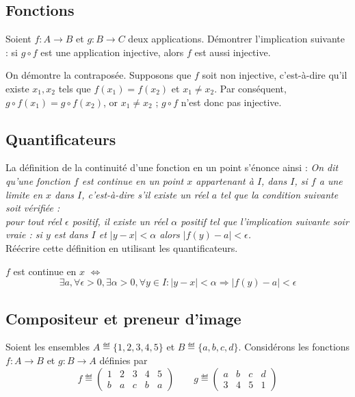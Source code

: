 \subsection{Fonctions}
Soient $f : A \rightarrow B$ et $g : B \rightarrow C$ deux applications. Démontrer l'implication suivante : si $ g \circ f$ est une application injective, alors $f$ est aussi injective. 

\begin{solution}
    On démontre la contraposée. Supposons que $f$ soit non injective, c'est-à-dire qu'il existe $x_1, x_2$ tels que $f(x_1) = f(x_2)$ et $x_1 \neq x_2$. Par conséquent, $g \circ f (x_1) = g \circ f(x_2)$, or $x_1 \neq x_2$ ; $g \circ f$ n'est donc pas injective.
\end{solution}

\subsection{Quantificateurs}
La définition de la continuité d'une fonction en un point s'énonce ainsi : \emph{On dit qu'une fonction $f$ est continue en un point $x$ appartenant à $I$, dans $I$, si $f$ a une limite en $x$ dans $I$, c'est-à-dire s'il existe un réel $a$ tel que la condition suivante soit vérifiée :\\
pour tout réel $\epsilon$ positif, il existe un réel $\alpha$ positif tel que l'implication suivante soir vraie : si $y$ est dans $I$ et $|y-x| < \alpha$ alors $|f(y) - a| < \epsilon$.}\\
    Réécrire cette définition en utilisant les quantificateurs.

\begin{solution}
    $f$ est continue en $x$ $\Leftrightarrow$
    \[ \exists a, \forall \epsilon > 0, \exists \alpha > 0, \forall y \in I : |y-x| < \alpha \Rightarrow |f(y) - a| < \epsilon \]
\end{solution}


\subsection{Compositeur et preneur d'image}
Soient les ensembles $A \eqdef \{ 1, 2, 3, 4, 5 \}$ et $B \eqdef \{ a, b, c, d \}$. Considérons les fonctions $f:A\rightarrow B$ et $g:B\rightarrow A$ définies par
\[ f \eqdef \begin{pmatrix}
        1 & 2 & 3 & 4 & 5 \\
        b & a & c & b & a
    \end{pmatrix}
    \qquad g \eqdef \begin{pmatrix}
        a & b & c & d \\
        3 & 4 & 5 & 1
    \end{pmatrix}
\]

